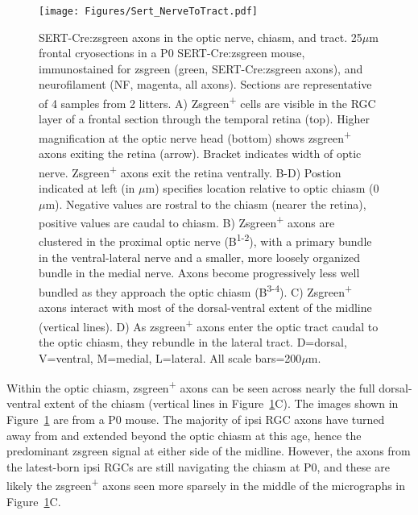 \begin{figure}[hbtp]
    \begin{center}
        \texttt{[image: Figures/Sert\_NerveToTract.pdf]}
        \caption[SERT-Cre:zsgreen axons in the optic nerve, chiasm, and tract.]
        {SERT-Cre:zsgreen axons in the optic nerve, chiasm, and tract.
        25$\mu$m frontal cryosections in a P0 SERT-Cre:zsgreen mouse, immunostained for zsgreen (green, SERT-Cre:zsgreen axons), and neurofilament (NF, magenta, all axons).
        Sections are representative of 4 samples from 2 litters. %
        A) Zsgreen\textsuperscript{+} cells are visible in the RGC layer of a frontal section through the temporal retina (top).
        Higher magnification at the optic nerve head (bottom) shows zsgreen\textsuperscript{+} axons exiting the retina (arrow).
        Bracket indicates width of optic nerve.
		Zsgreen\textsuperscript{+} axons exit the retina ventrally.
        B-D) Postion indicated at left (in $\mu$m) specifies location relative to optic chiasm (0$\mu$m).
        Negative values are rostral to the chiasm (nearer the retina), positive values are caudal to chiasm.
        B) Zsgreen\textsuperscript{+} axons are clustered in the proximal optic nerve (B\textsuperscript{1-2}), with a primary bundle in the ventral-lateral nerve and a smaller, more loosely organized bundle in the medial nerve.
        Axons become progressively less well bundled as they approach the optic chiasm (B\textsuperscript{3-4}).
        C) Zsgreen\textsuperscript{+} axons interact with most of the dorsal-ventral extent of the midline (vertical lines).
        D) As zsgreen\textsuperscript{+} axons enter the optic tract caudal to the optic chiasm, they rebundle in the lateral tract.
        D=dorsal, V=ventral, M=medial, L=lateral.
        All scale bars=200$\mu$m.}
        \label{Figures/SertNerveToTract}
    \end{center}
\end{figure}

Within the optic chiasm, zsgreen\textsuperscript{+} axons can be seen across nearly the full dorsal-ventral extent of the chiasm (vertical lines in Figure~\ref{Figures/SertNerveToTract}C).
The images shown in Figure~\ref{Figures/SertNerveToTract} are from a P0 mouse.
The majority of ipsi RGC axons have turned away from and extended beyond the optic chiasm at this age, hence the predominant zsgreen signal at either side of the midline.
However, the axons from the latest-born ipsi RGCs are still navigating the chiasm at P0, and these are likely the zsgreen\textsuperscript{+} axons seen more sparsely in the middle of the micrographs in Figure~\ref{Figures/SertNerveToTract}C.

